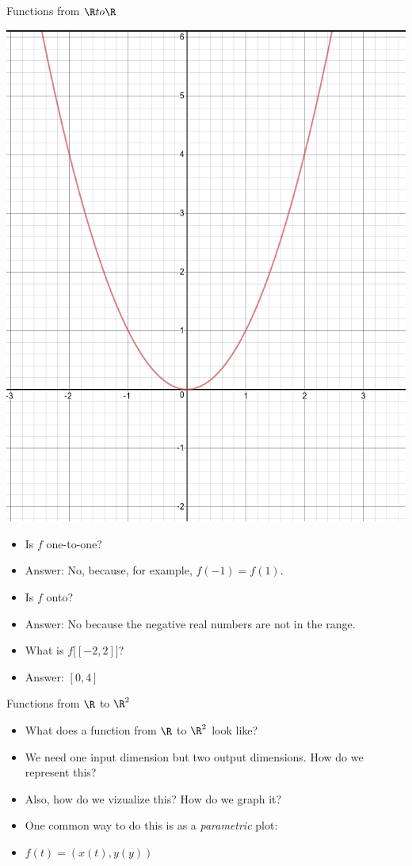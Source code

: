 \documentclass{beamer}
\begin{document}
\begin{frame}{Functions from $\R to \R$}

\includegraphics[scale=0.1]{parabola}

\begin{itemize}
\item Is $f$ one-to-one?
\item Answer: No, because, for example, $f(-1) = f(1)$.
\item Is $f$ onto?
\item Answer: No because the negative real numbers are not in the range.
\item What is $f\big[ [-2,2] \big]$?
\item Answer: $[0, 4]$
\end{itemize}

\end{frame}

\begin{frame}{Functions from $\R$ to $\R^2$}

\begin{itemize}
\item What does a function from $\R$ to $\R^2$ look like?
\item We need one input dimension but two output dimensions.
How do we represent this?
\item Also, how do we vizualize this? How do we graph it?
\item One common way to do this is as a \emph{parametric} plot:
\item $f(t) = (x(t), y(y))$
\end{itemize}

\end{frame}
\end{document}
